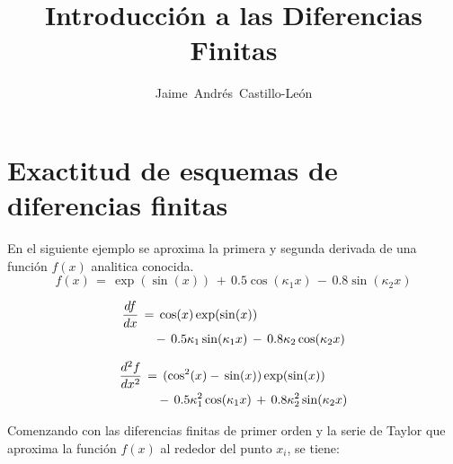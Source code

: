 \documentclass[9pt,technote,twoside,letterpaper,twocolumn]{IEEEtran}
\title{Introducción a las Diferencias Finitas}
\author{Jaime~Andrés~Castillo-León}
\begin{document}
\maketitle

\section{Exactitud de esquemas de diferencias finitas}
\label{sec:exac}
En el siguiente ejemplo se aproxima la primera y segunda derivada de una función $f(x)$ analitica conocida.
\begin{equation}
  f(x)\,=\,\exp(\sin(x))\,+\,0.5\cos(\kappa_1x)\,-\,0.8\sin(\kappa_2x)
  \label{eq:fun}
\end{equation}

\begin{align}
  \frac{df}{dx}\,&=\,\cos(x)\exp(\sin(x))\notag\\
&\quad-\,0.5\kappa_1\sin(\kappa_1x)\,-\,0.8\kappa_2\cos(\kappa_2x)
  \label{eq:dfun}
\end{align}

\begin{align}
  \frac{d^2f}{dx^2}\,&=\,(\cos^2(x)-\,\sin(x))\exp(\sin(x))\notag\\
&\quad-\,0.5\kappa^2_1\cos(\kappa_1x)\,+\,0.8\kappa^2_2\sin(\kappa_2x)
  \label{eq:d2fun}
\end{align}

Comenzando con las diferencias finitas de primer orden y la serie de Taylor que aproxima la función $f(x)$ al rededor del punto $x_i$, se tiene:
\end{document}
